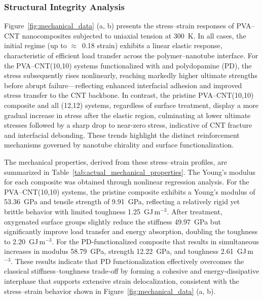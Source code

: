 \documentclass[journal=jacsat,manuscript=article]{achemso}
\begin{document}
\subsubsection{Structural Integrity Analysis}

Figure~\ref{fig:mechanical_data} (a, b) presents the stress--strain responses of PVA--CNT nanocomposites subjected to uniaxial tension at 300~K. In all cases, the initial regime (up to $\approx$~0.18 strain) exhibits a linear elastic response, characteristic of efficient load transfer across the polymer--nanotube interface. For the PVA--CNT(10,10) systems functionalized with  and polydopamine (PD), the stress subsequently rises nonlinearly, reaching markedly higher ultimate strengths before abrupt failure---reflecting enhanced interfacial adhesion and improved stress transfer to the CNT backbone. In contrast, the pristine PVA--CNT(10,10) composite and all (12,12) systems, regardless of surface treatment, display a more gradual increase in stress after the elastic region, culminating at lower ultimate stresses followed by a sharp drop to near-zero stress, indicative of CNT fracture and interfacial debonding. These trends highlight the distinct reinforcement mechanisms governed by nanotube chirality and surface functionalization.


\medskip

The mechanical properties, derived from these stress--strain profiles, are summarized in Table~\ref{tab:actual_mechanical_properties}. The Young’s modulus for each composite was obtained  through nonlinear regression
analysis\cite{brown2001step}. For the PVA--CNT(10,10) systems, the pristine composite exhibits a Young’s modulus of 53.36~GPa and tensile strength of 9.91~GPa, reflecting a relatively rigid yet brittle behavior with limited toughness 1.25~GJ\,m$^{-3}$. After  treatment, oxygenated surface groups slightly reduce the stiffness 49.97~GPa but significantly improve load transfer and energy absorption, doubling the toughness to 2.20~GJ\,m$^{-3}$. For the PD-functionalized composite that results in simultaneous increases in modulus 58.79~GPa, strength 12.22~GPa, and toughness 2.61~GJ\,m$^{-3}$. These results indicate that PD functionalization effectively overcomes the classical stiffness--toughness trade-off by forming a cohesive and energy-dissipative interphase that supports extensive strain delocalization, consistent with the stress--strain behavior shown in Figure~\ref{fig:mechanical_data} (a, b).

\medskip
\end{document}
